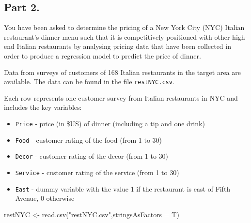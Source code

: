 \documentclass[
  letterpaper,
  DIV=11,
  numbers=noendperiod]{scrartcl}
\newenvironment{Shaded}{\begin{snugshade}}{\end{snugshade}}
\newcommand{\AttributeTok}[1]{\textcolor[rgb]{0.40,0.45,0.13}{#1}}
\newcommand{\FunctionTok}[1]{\textcolor[rgb]{0.28,0.35,0.67}{#1}}
\newcommand{\NormalTok}[1]{\textcolor[rgb]{0.00,0.23,0.31}{#1}}
\newcommand{\OtherTok}[1]{\textcolor[rgb]{0.00,0.23,0.31}{#1}}
\newcommand{\StringTok}[1]{\textcolor[rgb]{0.13,0.47,0.30}{#1}}
\providecommand{\tightlist}{%
  \setlength{\itemsep}{0pt}\setlength{\parskip}{0pt}}\usepackage{longtable,booktabs,array}
\begin{document}
\subsection{Part 2.}\label{part-2.}

You have been asked to determine the pricing of a New York City (NYC)
Italian restaurant's dinner menu such that it is competitively
positioned with other high-end Italian restaurants by analysing pricing
data that have been collected in order to produce a regression model to
predict the price of dinner.

Data from surveys of customers of 168 Italian restaurants in the target
area are available. The data can be found in the file
\texttt{restNYC.csv}.

Each row represents one customer survey from Italian restaurants in NYC
and includes the key variables:

\begin{itemize}
\tightlist
\item
  \texttt{Price} - price (in \$US) of dinner (including a tip and one
  drink)
\item
  \texttt{Food} - customer rating of the food (from 1 to 30)
\item
  \texttt{Decor} - customer rating of the decor (from 1 to 30)
\item
  \texttt{Service} - customer rating of the service (from 1 to 30)
\item
  \texttt{East} - dummy variable with the value 1 if the restaurant is
  east of Fifth Avenue, 0 otherwise
\end{itemize}

\begin{Shaded}
\begin{Highlighting}[]
\NormalTok{restNYC }\OtherTok{\textless{}{-}} \FunctionTok{read.csv}\NormalTok{(}\StringTok{"restNYC.csv"}\NormalTok{,}\AttributeTok{stringsAsFactors =}\NormalTok{ T)}
\end{Highlighting}
\end{Shaded}
\end{document}
